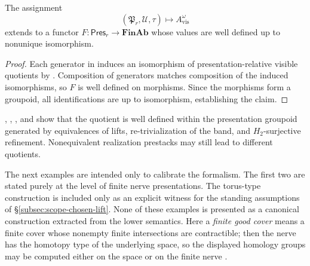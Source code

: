 \begin{proposition}\label{prop:presentation-groupoid}
The assignment
\[
(\mathfrak P_r,\mathcal U,\tau)\longmapsto A_{\mathrm{vis}}^{\omega}
\]
extends to a functor $F:\mathsf{Pres}_r\to \mathbf{FinAb}$ whose values are well defined up to nonunique isomorphism.
\end{proposition}

\begin{proof}
Each generator in  induces an isomorphism of presentation-relative visible quotients by . Composition of generators matches composition of the induced isomorphisms, so $F$ is well defined on morphisms. Since the morphisms form a groupoid, all identifications are up to isomorphism, establishing the claim.
\end{proof}

\begin{remark}[On ``invariance'']\label{rem:invariance-scope}
, , , and  show that the quotient is well defined within the presentation groupoid generated by equivalences of lifts, re-trivialization of the band, and $H_2$-surjective refinement. Nonequivalent realization prestacks may still lead to different quotients.
\end{remark}

The next examples are intended only to calibrate the formalism. The first two are stated purely at the level of finite nerve presentations. The torus-type construction is included only as an explicit witness for the standing assumptions of \S\ref{subsec:scope-chosen-lift}. None of these examples is presented as a canonical construction extracted from the lower semantics. Here a \emph{finite good cover} means a finite cover whose nonempty finite intersections are contractible; then the nerve has the homotopy type of the underlying space, so the displayed homology groups may be computed either on the space or on the finite nerve \cite[Secs.~4G, 4K]{Hatcher2002}.

